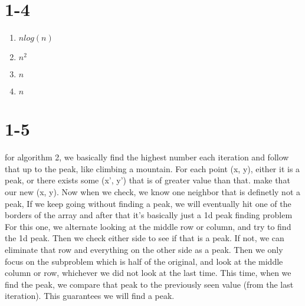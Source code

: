 \documentclass{article}
\begin{document}
    \section{1-4}
        \begin{enumerate}
            \item $nlog(n)$
            \item $n^2$
            \item $n$
            \item $n$
        \end{enumerate}
    \section{1-5} %
        for algorithm 2, we basically find the highest number each iteration and follow that up to the peak, like climbing a mountain. For each point (x, y), either it is a peak, or there exists some (x', y') that is of greater value than that. make that our new (x, y). Now when we check, we know one neighbor that is definetly not a peak, If we keep going without finding a peak, we will eventually hit one of the borders of the array and after that it's basically just a 1d peak finding
        problem\\

        For this one, we alternate looking at the middle row or column, and try to find the 1d peak. Then we check either side to see if that is a peak. If not, we can eliminate that row and everything on the other side as a peak. Then we only focus on the subproblem which is half of the original, and look at the middle column or row, whichever we did not look at the last time. This time, when we find the peak, we compare that peak to the previously seen value (from the last iteration).
        This guarantees we will find a peak. 
\end{document}
